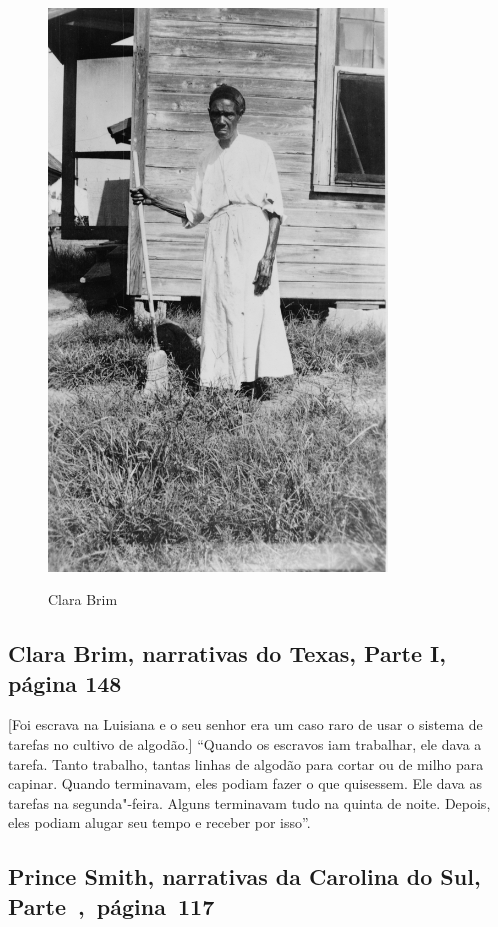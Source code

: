 \pagebreak
\thispagestyle{empty}
\begin{figure}[!ht]
\centering
 \includegraphics[width=90mm]{./imgs/clarabrim_recorte.jpg} \label{img4}
\caption{Clara Brim}
\end{figure}

\subsection{Clara Brim, narrativas do Texas, Parte I, página 148} \label{ref33}

{[}Foi escrava na Luisiana e o seu senhor era um caso raro de usar o %
sistema de tarefas no cultivo de algodão.{]} ``Quando os escravos iam
trabalhar, ele dava a tarefa. Tanto trabalho, tantas linhas de algodão
para cortar ou de milho para capinar. Quando terminavam, eles podiam
fazer o que quisessem. Ele dava as tarefas na segunda"-feira. Alguns
terminavam tudo na quinta de noite. Depois, eles podiam alugar seu tempo
e receber por isso''.

\subsection{Prince Smith, narrativas da Carolina do Sul, Parte~,~página~117}
\label{ref247}

